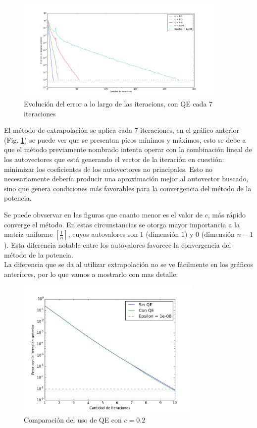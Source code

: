 \begin{figure}[H]
  \centering
    \includegraphics[width=0.9\textwidth]{errorConQE.png}
    \caption{Evolución del error a lo largo de las iteracions, con QE cada 7 iteraciones}
    \label{graf:errorQE}
\end{figure}

El m\'etodo de extrapolaci\'on se aplica cada 7 iteraciones, en el gr\'afico anterior (Fig. \ref{graf:errorQE}) se puede ver que se presentan picos m\'inimos y m\'aximos, esto se debe a que el m\'etodo previamente nombrado intenta operar con la combinación lineal de los autovectores que está generando el vector de la iteración en cuestión: minimizar los coeficientes de los autovectores no principales. Esto no necesariamente debería producir una aproximación mejor al autovector buscado, sino que genera condiciones más favorables para la convergencia del método de la potencia.

Se puede obvservar en las figuras que cuanto menor es el valor de $c$, m\'as r\'apido converge
el m\'etodo.  En estas circunstancias se otorga mayor importancia a la matriz uniforme $\left[\frac{1}{n}\right]$, cuyos autovalores son $1$ (dimensión $1$) y $0$ (dimensión $n-1$). Esta diferencia notable entre los autovalores favorece la convergencia del método de la potencia.\\

La diferencia que se da al utilizar extrapolaci\'on no se ve f\'acilmente en los gr\'aficos anteriores, por lo que vamos a mostrarlo con mas detalle:

\begin{figure}[H]
  \centering
    \includegraphics[width=0.8\textwidth]{comparando2.png}
    \caption{Comparaci\'on del uso de QE con $ c = 0.2$}
    \label{}
\end{figure}

